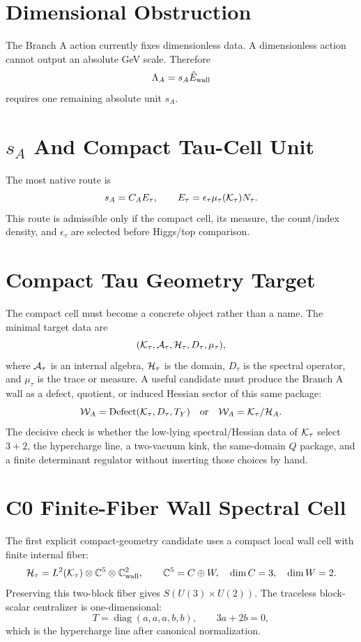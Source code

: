 \documentclass[11pt]{article}
\begin{document}
\section{Dimensional Obstruction}
The Branch A action currently fixes dimensionless data.  A dimensionless action
cannot output an absolute GeV scale.  Therefore
\begin{equation}
\Lambda_A=s_A\hat E_{\rm wall}
\end{equation}
requires one remaining absolute unit $s_A$.

\section{$s_A$ And Compact Tau-Cell Unit}
The most native route is
\begin{equation}
s_A=C_AE_\tau,
\qquad
E_\tau=\epsilon_\tau\mu_\tau({\cal K}_\tau)N_\tau.
\end{equation}
This route is admissible only if the compact cell, its measure, the count/index
density, and $\epsilon_\tau$ are selected before Higgs/top comparison.

\section{Compact Tau Geometry Target}
The compact cell must become a concrete object rather than a name.  The
minimal target data are
\begin{equation}
({\cal K}_\tau,{\cal A}_\tau,{\cal H}_\tau,D_\tau,\mu_\tau),
\end{equation}
where ${\cal A}_\tau$ is an internal algebra, ${\cal H}_\tau$ is the
domain, $D_\tau$ is the spectral operator, and $\mu_\tau$ is the trace or
measure.  A useful candidate must produce the Branch A wall as a defect,
quotient, or induced Hessian sector of this same package:
\begin{equation}
{\cal W}_A={\rm Defect}({\cal K}_\tau,D_\tau,T_Y)
\quad{\rm or}\quad
{\cal W}_A={\cal K}_\tau/{\cal H}_A .
\end{equation}
The decisive check is whether the low-lying spectral/Hessian data of
${\cal K}_\tau$ select $3+2$, the hypercharge line, a two-vacuum kink, the
same-domain $Q$ package, and a finite determinant regulator without inserting
those choices by hand.

\section{C0 Finite-Fiber Wall Spectral Cell}
The first explicit compact-geometry candidate uses a compact local wall cell
with finite internal fiber:
\begin{equation}
{\cal H}_\tau=L^2({\cal K}_\tau)\otimes\mathbb{C}^5\otimes\mathbb{C}^2_{\rm wall},
\qquad
\mathbb{C}^5=C\oplus W,\quad \dim C=3,\quad \dim W=2.
\end{equation}
Preserving this two-block fiber gives $S(U(3)\times U(2))$.  The traceless
block-scalar centralizer is one-dimensional:
\begin{equation}
T=\operatorname{diag}(a,a,a,b,b),\qquad 3a+2b=0,
\end{equation}
which is the hypercharge line after canonical normalization.
\end{document}
